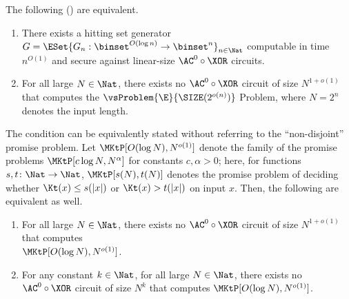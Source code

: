 \documentclass{toc}
\begin{document}
\begin{theorem}
  \label{thm_AC0XOREquiv}
  The following () are equivalent.
  \begin{enumerate}
    \item
          \label{item_HSGagainstAC0XOR}
          There exists a hitting set generator $G = \ESet{ G_n : \binset^{O(\log n)} \to \binset^n }_{n \in \Nat} $ computable in time $n^{O(1)}$ and secure against linear-size $\AC^0 \circ \XOR$ circuits.
    \item
          \label{item_EvsSIZE}
          For all large $N \in \Nat$,
          there exists no $\AC^0 \circ \XOR$ circuit of size
          $N^{1 + o(1)}$
          that computes
          the $\vsProblem{\E}{\SIZE (2^{o(n)})}$ Problem, where $N = 2^n$ denotes the input length.
          \setcounter{TEMPenumi}{\value{enumi}}
  \end{enumerate}
  \begin{upshape}
    The condition can be equivalently stated without referring to the ``non-disjoint'' promise problem.
    Let $\MKtP[O(\log N), N^{o(1)}]$ denote the family of the promise problems
    $\MKtP[c \log N, N^\alpha]$ for constants $c, \alpha > 0$;
    here,
    for functions $s, t \colon \Nat \to \Nat$,
    $\MKtP[s(N), t(N)]$ denotes the promise problem of
    deciding whether $\Kt(x) \le s(|x|)$
    or $\Kt(x) > t(|x|)$ on input $x$.
    Then, the following are equivalent as well.
  \end{upshape}
  \begin{enumerate}
    \setcounter{enumi}{\value{TEMPenumi}}
    \item
          \label{item_EvsKt}
          For all large $N \in \Nat$,
          there exists no $\AC^0 \circ \XOR$ circuit of size
          $N^{1 + o(1)}$
          that computes\\  %
          $\MKtP[O(\log N), N^{o(1)}]$.
    \item
          \label{item_EvsKtLarge}
          For any constant $k \in \Nat$,
          for all large $N \in \Nat$,
          there exists no $\AC^0 \circ \XOR$ circuit of size
          $N^{k}$
          that computes
          $\MKtP[O(\log N), N^{o(1)}]$.
  \end{enumerate}
\end{theorem}

%
%
\end{document}
